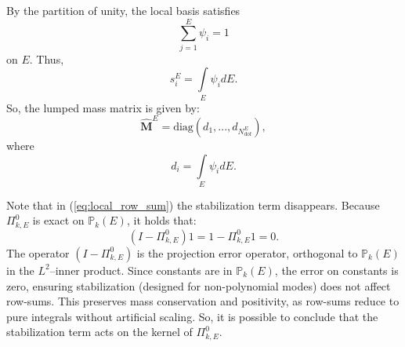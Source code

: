 \documentclass{article}
\newcommand{\numdofs}{N^E_{\text{dof}}}
\begin{document}
By the partition of unity, the local basis satisfies
\begin{equation}
    \nonumber
    \sum \limits^E_{j=1}\psi_i = 1
\end{equation}
on $E$. Thus,
\begin{equation}\label{eq:local_row_sum}
    s^E_i = \int \limits_E \psi_i dE.
\end{equation}
So, the lumped mass matrix is given by:
\begin{equation}
    \nonumber
    \hat{\mathbf{M}}^E = \text{diag} \left( d_1, ..., d_{\numdofs} \right),
\end{equation}
where
\begin{equation}
    \nonumber
    d_i = \int \limits_E \psi_i dE.
\end{equation}

Note that in (\ref{eq:local_row_sum}) the stabilization term disappears. Because $\Pi^{0}_{k,E}$ is exact on $\mathbb{P}_k(E)$, it holds that:
\begin{equation}
    \nonumber
    (I - \Pi^{0}_{k,E})1 = 1 - \Pi^{0}_{k,E}1 = 0.
\end{equation}
The operator $(I-\Pi^{0}_{k,E})$ is the projection error operator, orthogonal to $\mathbb{P}_k(E)$ in the $L^2$--inner product. Since constants are in $\mathbb{P}_k(E)$, the error on constants is zero, ensuring stabilization (designed for non-polynomial modes) does not affect row-sums. This preserves mass conservation and positivity, as row-sums reduce to pure integrals without artificial scaling. So, it is possible to conclude that the stabilization term acts on the kernel of $\Pi^{0}_{k,E}$.  
\end{document}
